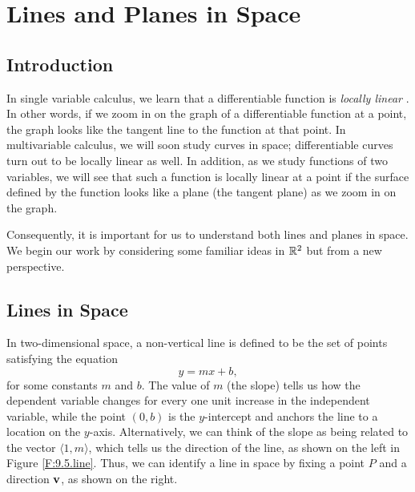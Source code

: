 
\section{Lines and Planes in Space} \label{S:9.5.Lines_Planes}

\vspace*{-14 pt}

\subsection*{Introduction}

In single variable calculus, we learn that a differentiable function
is \emph{locally linear} . In other words, if we
zoom in on the graph of a differentiable function at a point, the
graph looks like the tangent line to the function at that point.  In
multivariable calculus, we will soon study curves in space;
differentiable curves turn out to be locally linear as well.  In
addition, as we study functions of two variables, we will see that
such a function is locally linear at a point if the surface defined by
the function looks like a plane (the tangent plane) as we zoom in on
the graph.

Consequently, it is important for us to understand both lines and
planes in space.  We begin our work by considering some familiar ideas
in $\mathbb{R}^2$ but from a new perspective.



\subsection*{Lines in Space}
In two-dimensional space, a non-vertical line is defined to be the set
of points satisfying the equation
\[y = mx + b,\] for some constants $m$ and $b$. The value of $m$ (the
slope) tells us how the dependent variable changes for every one unit
increase in the independent variable, while the point $(0,b)$ is the
$y$-intercept and anchors the line to a location on the
$y$-axis. Alternatively, we can think of the slope as being related to
the vector $\langle 1, m \rangle$, which tells us the direction of the
line, as shown on the left in Figure \ref{F:9.5.line}. Thus, we can
identify a line in space by fixing a point $P$ and  
a direction $\mathbf{v}$, as shown on the right.

